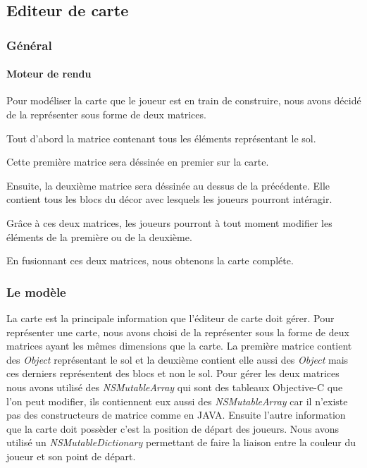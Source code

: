 			

\subsection{Editeur de carte}

	\hypertarget{Editeur de carte}{}
	\label{Editeur de carte}
	
	\subsubsection{Général}
		\paragraph{Moteur de rendu\\}
			Pour modéliser la carte que le joueur est en train de construire, nous avons décidé de la représenter sous forme de deux matrices. 
			
			Tout d'abord la matrice contenant tous les éléments représentant le sol.
			\begin{center}
			\end{center}
			Cette première matrice sera déssinée en premier sur la carte.
			
			Ensuite, la deuxième matrice sera déssinée au dessus de la précédente. Elle contient tous les blocs du décor avec lesquels les joueurs pourront intéragir. 
			\begin{center}
			\end{center}
			
			Grâce à ces deux matrices, les joueurs pourront à tout moment modifier les éléments de la première ou de la deuxième.
			
			En fusionnant ces deux matrices, nous obtenons la carte compléte.
			\begin{center}
			\end{center}
			

	\subsubsection{Le modèle}
		La carte est la principale information que l'éditeur de carte doit gérer. Pour représenter une carte, nous avons choisi de la représenter sous la forme de deux matrices ayant les mêmes dimensions que la carte. La première matrice contient des \textit{Object} représentant le sol et la deuxième contient elle aussi des \textit{Object} mais ces derniers représentent des blocs et non le sol. Pour gérer les deux matrices nous avons utilisé des \textit{NSMutableArray} qui sont des tableaux Objective-C que l'on peut modifier, ils contiennent eux aussi des \textit{NSMutableArray} car il n'existe pas des constructeurs de matrice comme en JAVA. Ensuite l'autre information que la carte doit possèder c'est la position de départ des joueurs. Nous avons utilisé un \textit{NSMutableDictionary} permettant de faire la liaison entre la couleur du joueur et son point de départ. 
			
